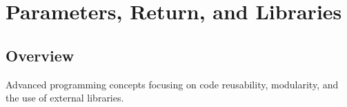 \chapter{Parameters, Return, and Libraries}

\section*{Overview}
Advanced programming concepts focusing on code reusability, modularity, and the use of external libraries.

